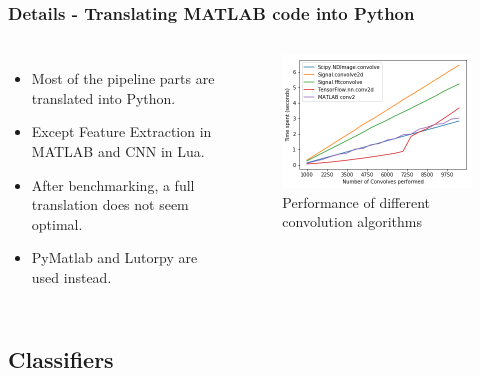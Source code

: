 \documentclass{beamer}[fullspacing]
\begin{document}
\begin{frame}
\frametitle{Details - Translating MATLAB code into Python}

\begin{columns}
\begin{itemize}
\item
Most of the pipeline parts are translated into Python.
\item
Except Feature Extraction in MATLAB and CNN in Lua.
\item
After benchmarking, a full translation does not seem optimal.
\item 
PyMatlab and Lutorpy are used instead.
\end{itemize}

\begin{figure}
\includegraphics[scale=0.3]{image/benchmark.png}
\caption{Performance of different convolution algorithms}
\end{figure}
\end{columns}

\end{frame}



\subsection{Classifiers}
\end{document}

